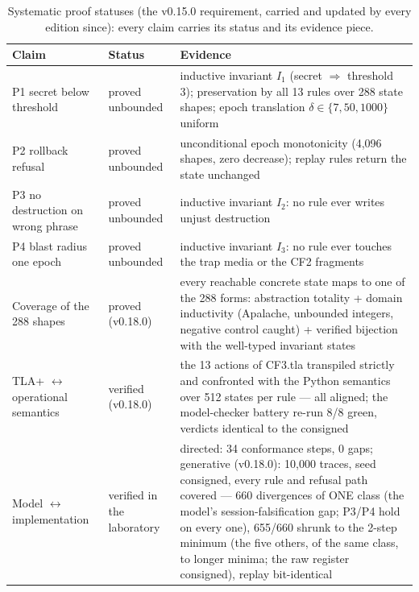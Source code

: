 \begingroup\scriptsize
\begin{longtable}{@{}p{3.4cm} p{2.9cm} p{8.4cm}@{}}
\caption{Systematic proof statuses (the v0.15.0 requirement, carried and updated by every edition since): every claim carries its status and its evidence piece.}\label{tab:statuts}\\
\toprule
\textbf{Claim} & \textbf{Status} & \textbf{Evidence} \\
\midrule
\endhead
\bottomrule
\endfoot
P1 secret below threshold & proved unbounded & inductive invariant $I_1$ (secret $\Rightarrow$ threshold 3); preservation by all 13 rules over 288 state shapes; epoch translation $\delta\in\{7,50,1000\}$ uniform \\
P2 rollback refusal & proved unbounded & unconditional epoch monotonicity (4{,}096 shapes, zero decrease); replay rules return the state unchanged \\
P3 no destruction on wrong phrase & proved unbounded & inductive invariant $I_2$: no rule ever writes unjust destruction \\
P4 blast radius one epoch & proved unbounded & inductive invariant $I_3$: no rule ever touches the trap media or the CF2 fragments \\
Coverage of the 288 shapes & proved (v0.18.0) & every reachable concrete state maps to one of the 288 forms: abstraction totality + domain inductivity (Apalache, unbounded integers, negative control caught) + verified bijection with the well-typed invariant states \\
TLA+ $\leftrightarrow$ operational semantics & verified (v0.18.0) & the 13 actions of CF3.tla transpiled strictly and confronted with the Python semantics over 512 states per rule --- all aligned; the model-checker battery re-run 8/8 green, verdicts identical to the consigned \\
Model $\leftrightarrow$ implementation & verified in the laboratory & directed: 34 conformance steps, 0 gaps; generative (v0.18.0): 10{,}000 traces, seed consigned, every rule and refusal path covered --- 660 divergences of ONE class (the model's session-falsification gap; P3/P4 hold on every one), 655/660 shrunk to the 2-step minimum (the five others, of the same class, to longer minima; the raw register consigned), replay bit-identical \\

\end{longtable}
